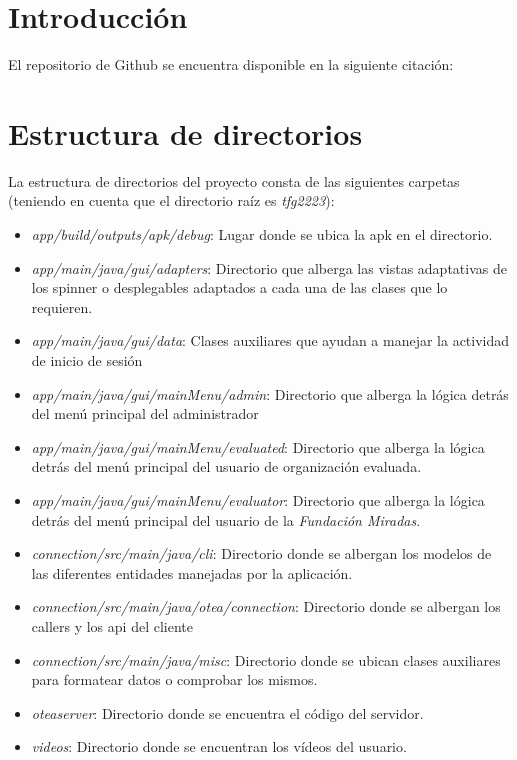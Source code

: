 
\section{Introducción}

El repositorio de Github se encuentra disponible en la siguiente citación:\cite{guiaOTEARepo}

\section{Estructura de directorios}
La estructura de directorios del proyecto consta de las siguientes carpetas (teniendo en cuenta que el directorio raíz es \textit{tfg2223}):
\begin{itemize}
    \item \textit{app/build/outputs/apk/debug}: Lugar donde se ubica la apk en el directorio.
    \item \textit{app/main/java/gui/adapters}: Directorio que alberga las vistas adaptativas de los spinner o desplegables adaptados a cada una de las clases que lo requieren.
    \item \textit{app/main/java/gui/data}: Clases auxiliares que ayudan a manejar la actividad de inicio de sesión
    \item \textit{app/main/java/gui/mainMenu/admin}: Directorio que alberga la lógica detrás del menú principal del administrador
    \item \textit{app/main/java/gui/mainMenu/evaluated}: Directorio que alberga la lógica detrás del menú principal del usuario de organización evaluada.
    \item \textit{app/main/java/gui/mainMenu/evaluator}: Directorio que alberga la lógica detrás del menú principal del usuario de la \textit{Fundación Miradas}.
    \item \textit{connection/src/main/java/cli}: Directorio donde se albergan los modelos de las diferentes entidades manejadas por la aplicación.
    \item \textit{connection/src/main/java/otea/connection}: Directorio donde se albergan los callers y los api del cliente
    \item \textit{connection/src/main/java/misc}: Directorio donde se ubican clases auxiliares para formatear datos o comprobar los mismos.
    \item \textit{oteaserver}: Directorio donde se encuentra el código del servidor.
    \item \textit{videos}: Directorio donde se encuentran los vídeos del usuario.
\end{itemize}

